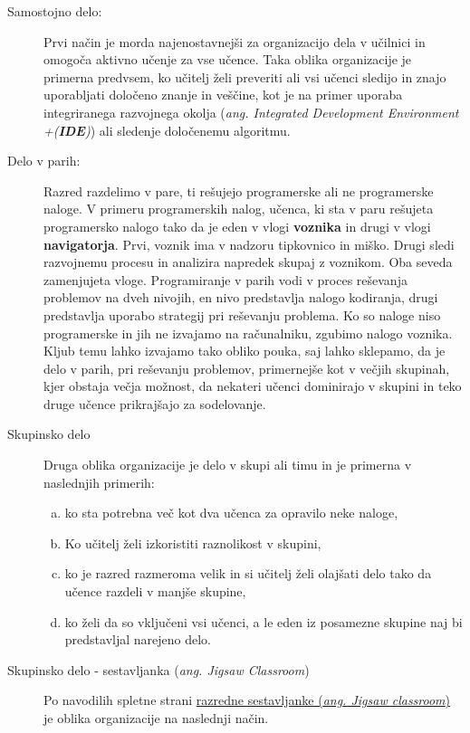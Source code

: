 \begin{description}
\item[Samostojno delo:] Prvi način je morda najenostavnejši
  za organizacijo dela v učilnici in omogoča aktivno učenje za vse
  učence. Taka oblika organizacije je primerna predvsem, ko učitelj
  želi preveriti ali vsi učenci sledijo in znajo uporabljati določeno
  znanje in veščine, kot je na primer uporaba integriranega razvojnega
  okolja (\emph{ang. Integrated Development Environment
    +(\textbf{IDE})}) ali sledenje določenemu algoritmu.
\item[Delo v parih:] Razred razdelimo v pare, ti rešujejo
  programerske ali ne programerske naloge. V primeru programerskih
  nalog, učenca, ki sta v paru rešujeta programersko nalogo tako da je
  eden v vlogi \textbf{voznika} in drugi v vlogi
  \textbf{navigatorja}. Prvi, voznik ima v nadzoru tipkovnico in
  miško. Drugi sledi razvojnemu procesu in analizira napredek skupaj z
  voznikom. Oba seveda zamenjujeta vloge. Programiranje v parih vodi v
  proces reševanja problemov na dveh nivojih, en nivo predstavlja
  nalogo kodiranja, drugi predstavlja uporabo strategij pri reševanju
  problema. Ko so naloge niso programerske in jih ne izvajamo na
  računalniku, zgubimo nalogo voznika. Kljub temu lahko izvajamo tako
  obliko pouka, saj lahko sklepamo, da je delo v parih, pri reševanju
  problemov, primernejše kot v večjih skupinah, kjer obstaja večja
  možnost, da nekateri učenci dominirajo v skupini in teko druge
  učence prikrajšajo za sodelovanje.
\item[Skupinsko delo] Druga oblika organizacije je delo v
  skupi ali timu in je primerna v naslednjih primerih:
  \begin{enumerate}[a.]
  \item ko sta potrebna več kot dva učenca za opravilo neke naloge,
  \item Ko učitelj želi izkoristiti raznolikost v skupini,
  \item ko je razred razmeroma velik in si učitelj želi olajšati delo
    tako da učence razdeli v manjše skupine,
  \item ko želi da so vključeni vsi učenci, a le eden iz posamezne
    skupine naj bi predstavljal narejeno delo.
  \end{enumerate}
\item[Skupinsko delo - sestavljanka (\emph{ang. Jigsaw Classroom})] Po
  navodilih spletne strani \href{https://www.jigsaw.org/}{razredne
    sestavljanke (\emph{ang. Jigsaw classroom})} je oblika
  organizacije na naslednji način.

\end{description}
